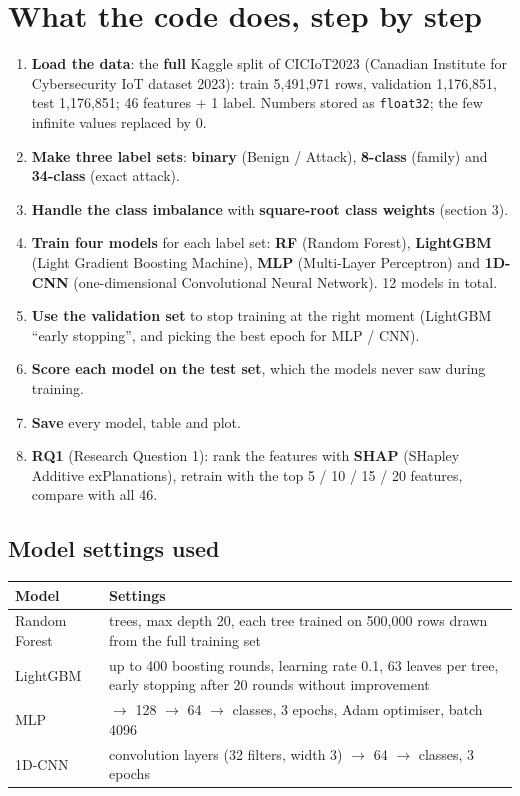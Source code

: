 \documentclass[11pt]{article}
\begin{document}
\section{What the code does, step by step}
\begin{enumerate}
\item \textbf{Load the data}: the \textbf{full} Kaggle split of CICIoT2023 (Canadian Institute for Cybersecurity IoT dataset 2023):
train 5,491,971 rows, validation 1,176,851, test 1,176,851; 46 features + 1 label. Numbers stored as \texttt{float32}; the few infinite values replaced by 0.
\item \textbf{Make three label sets}: \textbf{binary} (Benign / Attack), \textbf{8-class} (family) and \textbf{34-class} (exact attack).
\item \textbf{Handle the class imbalance} with \textbf{square-root class weights} (section 3).
\item \textbf{Train four models} for each label set: \textbf{RF} (Random Forest), \textbf{LightGBM} (Light Gradient Boosting Machine),
\textbf{MLP} (Multi-Layer Perceptron) and \textbf{1D-CNN} (one-dimensional Convolutional Neural Network). 12 models in total.
\item \textbf{Use the validation set} to stop training at the right moment (LightGBM ``early stopping'', and picking the best epoch for MLP / CNN).
\item \textbf{Score each model on the test set}, which the models never saw during training.
\item \textbf{Save} every model, table and plot.
\item \textbf{RQ1} (Research Question 1): rank the features with \textbf{SHAP} (SHapley Additive exPlanations), retrain with the top 5 / 10 / 15 / 20 features, compare with all 46.
\end{enumerate}

\subsection*{Model settings used}
\begin{tabular}{@{}l >{\raggedright\arraybackslash}p{12.4cm}@{}}
\toprule
\textbf{Model} & \textbf{Settings} \\
\midrule
Random Forest & 100 trees, max depth 20, each tree trained on 500,000 rows drawn from the full training set \\
LightGBM & up to 400 boosting rounds, learning rate 0.1, 63 leaves per tree, early stopping after 20 rounds without improvement \\
MLP & 46 $\rightarrow$ 128 $\rightarrow$ 64 $\rightarrow$ classes, 3 epochs, Adam optimiser, batch 4096 \\
1D-CNN & 2 convolution layers (32 filters, width 3) $\rightarrow$ 64 $\rightarrow$ classes, 3 epochs \\
\bottomrule
\end{tabular}
\end{document}
